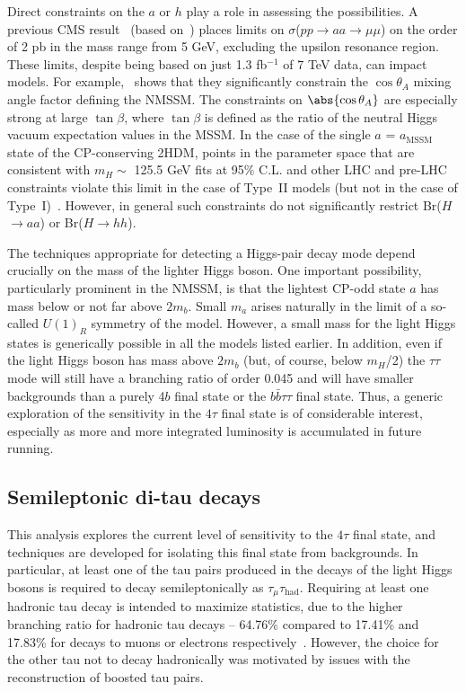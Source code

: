 Direct constraints on the $a$ or $h$ play a role in assessing the possibilities. A previous CMS result~\cite{Chatrchyan:2012am} (based on~\cite{Dermisek:2009fd}) places limits on $\sigma$($pp$$\rightarrow$$aa$$\rightarrow$$\mu\mu$) on the order of 2 pb in the mass range from 5 GeV, excluding the upsilon resonance region.  These limits, despite being based on just 1.3 fb$^{-1}$ of 7 TeV data, can impact models. For example,~\cite{Chatrchyan:2012am} shows that they significantly constrain the $\cos\theta_A$ mixing angle factor defining the NMSSM.  The constraints on $\abs{\cos\theta_A}$ are especially strong at large $\tan\beta$, where $\tan\beta$ is defined as the ratio of the neutral Higgs vacuum expectation values in the MSSM. In the case of the single $a$ = $a_{\text{MSSM}}$ state of the CP-conserving 2HDM, points in the parameter space that are consistent with $m_H \sim$ 125.5 GeV fits at 95\% C.L. and other LHC and pre-LHC constraints violate this limit in the case of Type~II models (but not in the case of Type~I)~\cite{Dumont:2014wha}.  However, in general such constraints do not significantly restrict Br($H$$\rightarrow$$aa$) or Br($H$$\rightarrow$$hh$).  

The techniques appropriate for detecting a Higgs-pair decay mode depend crucially on the mass of the lighter Higgs boson. One important possibility, particularly prominent in the NMSSM, is that the lightest CP-odd state $a$ has mass below or not far above $2m_b$. Small $m_a$ arises naturally in the limit of a so-called $U(1)_R$ symmetry of the model. However, a small mass for the light Higgs states is generically possible in all the models listed earlier. In addition, even if the light Higgs boson has mass above $2m_b$ (but, of course, below $m_H$/2) the $\tau\tau$ mode will still have a branching ratio of order 0.045 and will have smaller backgrounds than a purely 4$b$ final state or the $b\bar{b}\tau\tau$ final state. Thus, a generic exploration of the sensitivity in the $4\tau$ final state is of considerable interest, especially as more and more integrated luminosity is accumulated in future running.

\subsection{Semileptonic di-tau decays\label{sec:semileptonic}}
This analysis explores the current level of sensitivity to the $4\tau$ final state, and techniques are developed for isolating this final state from backgrounds. In particular, at least one of the tau pairs produced in the decays of the light Higgs bosons is required to decay semileptonically as $\tau_{\mu}\tau_{\text{had}}$. Requiring at least one hadronic tau decay is intended to maximize statistics, due to the higher branching ratio for hadronic tau decays -- 64.76\% compared to 17.41\% and 17.83\% for decays to muons or electrons respectively~\cite{Agashe:2014kda}. However, the choice for the other tau not to decay hadronically was motivated by issues with the reconstruction of boosted tau pairs.

